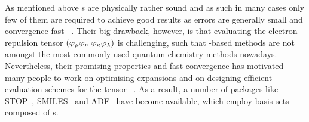 As mentioned above {\STO}s are physically rather sound
and as such in many cases only few of them are required to achieve good results
as errors are generally small and convergence fast%
~\cite{Shepard2007,Guell2008,Hoggan2009,Hoggan2011}.
Their big drawback, however,
is that evaluating the electron repulsion tensor
$\left( \varphi_\mu \varphi_\nu \middle| \varphi_\kappa \varphi_\lambda \right)$
is challenging,
such that \STO-based methods
are not amongst the most commonly used quantum-chemistry methods nowadays.
Nevertheless, their promising properties and fast convergence
has motivated many people to work on optimising \STO expansions
and on designing efficient evaluation schemes for the \ERI tensor%
~\cite{Weniger1983,Hoggan2009,Hoggan2011,Avery2013,Avery2017}.
As a result, a number of packages
like STOP~\cite{Bouferguene1996},
SMILES~\cite{FernandezRico2001}
and ADF~\cite{ADF}
have become available,
which employ basis sets composed of {\STO}s.
